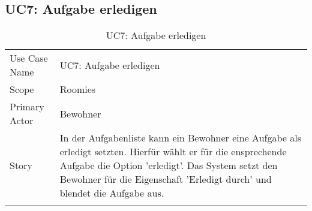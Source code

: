 \subsection{UC7: Aufgabe erledigen}
\begin{table}[H]
	\tablestyle
	\tablealtcolored
	\begin{tabularx}{\textwidth}{lX}
		\tablebody
			Use Case Name &
			UC7: Aufgabe erledigen
			\tabularnewline
			Scope &
			Roomies
			\tabularnewline
			Primary Actor &
			Bewohner
			\tabularnewline
			Story &
			In der Aufgabenliste kann ein Bewohner eine Aufgabe als erledigt setzten. Hierfür wählt er für die ensprechende Aufgabe die Option 'erledigt'. Das System setzt den Bewohner für die Eigenschaft 'Erledigt durch' und blendet die Aufgabe aus.
			\tabularnewline
		\tableend
	\end{tabularx}
	\caption{UC7: Aufgabe erledigen}
\end{table}


